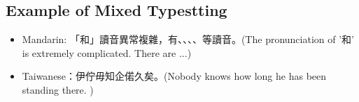 \subsection{Example of Mixed Typestting}
\begin{itemize}
	\item Mandarin: 「和」讀音異常複雜，有、、、、等讀音。(The pronunciation of '和' is extremely complicated. There are ...)
	\item Taiwanese：伊佇毋知企偌久矣。(Nobody knows how long he has been standing there. )
\end{itemize}

\clearpage